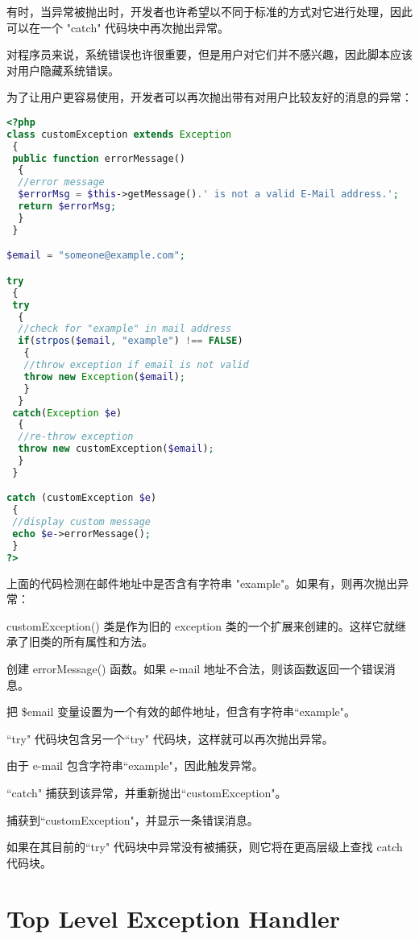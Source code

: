 有时，当异常被抛出时，开发者也许希望以不同于标准的方式对它进行处理，因此可以在一个 "catch" 代码块中再次抛出异常。


对程序员来说，系统错误也许很重要，但是用户对它们并不感兴趣，因此脚本应该对用户隐藏系统错误。

为了让用户更容易使用，开发者可以再次抛出带有对用户比较友好的消息的异常：

\begin{lstlisting}[language=PHP]
<?php
class customException extends Exception
 {
 public function errorMessage()
  {
  //error message
  $errorMsg = $this->getMessage().' is not a valid E-Mail address.';
  return $errorMsg;
  }
 }

$email = "someone@example.com";

try
 {
 try
  {
  //check for "example" in mail address
  if(strpos($email, "example") !== FALSE)
   {
   //throw exception if email is not valid
   throw new Exception($email);
   }
  }
 catch(Exception $e)
  {
  //re-throw exception
  throw new customException($email);
  }
 }

catch (customException $e)
 {
 //display custom message
 echo $e->errorMessage();
 }
?>
\end{lstlisting}

上面的代码检测在邮件地址中是否含有字符串 "example"。如果有，则再次抛出异常：

\begin{compactenum}
\item customException() 类是作为旧的 exception 类的一个扩展来创建的。这样它就继承了旧类的所有属性和方法。
\item 创建 errorMessage() 函数。如果 e-mail 地址不合法，则该函数返回一个错误消息。
\item 把 \$email 变量设置为一个有效的邮件地址，但含有字符串``example"。
\item ``try" 代码块包含另一个``try" 代码块，这样就可以再次抛出异常。
\item 由于 e-mail 包含字符串``example"，因此触发异常。
\item ``catch" 捕获到该异常，并重新抛出``customException"。
\item 捕获到``customException"，并显示一条错误消息。
\end{compactenum}

如果在其目前的``try" 代码块中异常没有被捕获，则它将在更高层级上查找 catch 代码块。


\section{Top Level Exception Handler}

